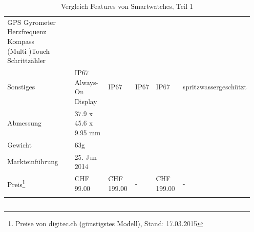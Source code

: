 \begin{landscape}
\begin{longtable}{p{3cm}p{4cm}p{4cm}p{4cm}p{4cm}p{4cm}}
			GPS \newline
			Gyrometer \newline
			Herzfrequenz \newline
			Kompass \newline
			(Multi-)Touch \newline
			Schrittzähler \\
	Sonstiges
		& IP67 \newline
			Always-On Display
		& IP67
		& IP67
		& IP67
		& spritzwassergeschützt \\
	Abmessung
		& 37.9 x 45.6 x 9.95 mm
		&
		& \\
	Gewicht
		& 63g
		&
		& \\ 
	Markteinführung
		& 25. Jun 2014
		&
		& \\
	Preis\footnote{Preise von digitec.ch (günstigstes Modell), Stand: 17.03.2015}
		& CHF 99.00
		& CHF 199.00
		& -
		& CHF 199.00
		& - \\
	\hline
	\caption{Vergleich Features von Smartwatches, Teil 1} \\
\end{longtable}
\newpage

\begin{longtable}{p{3cm}p{4cm}p{4cm}p{4cm}p{4cm}p{4cm}}


\end{longtable}
\end{landscape}
